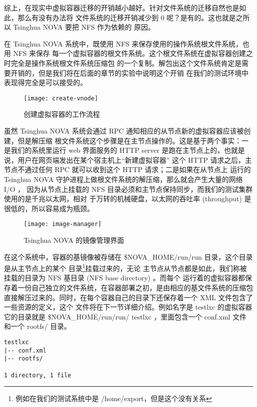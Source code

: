 综上，在现实中虚拟容器迁移的开销越小越好。针对文件系统的迁移自然也是如此，那么有没有办法将
文件系统的迁移开销减少到 0 呢？是有的。这也就是之所以 Tsinghua NOVA 要把 NFS 作为依赖的
原因。

在 Tsinghua NOVA 系统中，既使用 NFS 来保存使用的操作系统根文件系统，也用 NFS 来保存
每一个虚拟容器的根文件系统。这个根文件系统在虚拟容器创建之时完全是操作系统根文件系统压缩包
的一个复制。解包出这个文件系统肯定是需要开销的，但是我们将在后面的章节的实验中说明这个开销
在我们的测试环境中表现得完全是可以接受的。

\begin{figure}[t]
    \centering
    \texttt{[image: create-vnode]}
    \caption{创建虚拟容器的工作流程}
\end{figure}

虽然 Tsinghua NOVA 系统会通过 RPC 通知相应的从节点新的虚拟容器应该被创建，但是解压缩
根文件系统这个步骤是在主节点操作的。这是基于两个事实：一是我们的系统里运行 web 界面服务的
HTTP server 是跑在主节点上的，也就是说，用户在网页端发出在某个宿主机上“新建虚拟容器”
这个 HTTP 请求之后，主节点不通过任何 RPC 就可以收到这个 HTTP 请求；二是如果在从节点上
运行的 Tsinghua NOVA 守护进程上做根文件系统的解压缩，那么就会产生大量的网络 I/O ，
因为从节点上挂载的 NFS 目录必须和主节点保持同步，而我们的测试集群使用的是千兆以太网，相对
于万转的机械硬盘，以太网的吞吐率 (throughput) 是很低的，所以容易成为瓶颈。

\begin{figure}[H]
    \centering
    \texttt{[image: image-manager]}
    \caption{Tsinghua NOVA 的镜像管理界面}
\end{figure}

在这个系统中，容器的基镜像被存储在 \$NOVA\_HOME/run/run 目录，这个目录是从主节点上的某个
目录\footnote{例如在我们的测试系统中是 /home/export，但是这个没有关系}挂载过来的，无论
主节点从节点都是如此，我们称被挂载的目录为 NFS 基目录 (NFS base directory) 。而每个
运行着的虚拟容器都保存着一份自己独立的文件系统，在容器部署之初，是由相应的基文件系统的压缩包
直接解压过来的。同时，在每个容器自己的目录下还保存着一个 XML 文件包含了一些资源的定义，这个
文件将在下一节详细介绍。例如名字是 testlxc 的虚拟容器它的目录就是 \$NOVA\_HOME/run/run/
testlxc ，里面包含一个 conf.xml 文件和一个 rootfs/ 目录。


\begin{lstlisting}
testlxc
|-- conf.xml
|-- rootfs/

1 directory, 1 file
\end{lstlisting}

